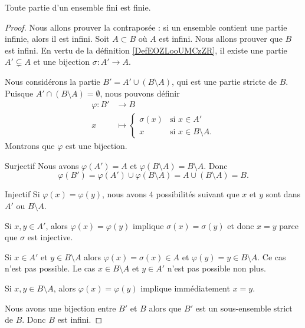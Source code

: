 \begin{lemma}       \label{LEMooTUIRooEXjfDY}
    Toute partie d'un ensemble fini est finie.
\end{lemma}

\begin{proof}
    Nous allons prouver la contraposée : si un ensemble contient une partie infinie, alors il est infini. Soit \( A\subset B\) où \( A\) est infini. Nous allons prouver que \( B\) est infini. En vertu de la définition \ref{DefEOZLooUMCzZR}, il existe une partie \( A'\subsetneq A\) et une bijection \( \sigma\colon A'\to A\).

    Nous considérons la partie \( B'=A'\cup(B\setminus A)\), qui est une partie stricte de \( B\). Puisque \( A'\cap (B\setminus A)=\emptyset\), nous pouvons définir
    \begin{equation}
        \begin{aligned}
            \varphi\colon B'&\to B \\
            x&\mapsto \begin{cases}
                \sigma(x)    &   \text{si } x\in A'\\
                x    &    \text{si } x\in B\setminus A.
            \end{cases}
        \end{aligned}
    \end{equation}
    Montrons que \( \varphi\) est une bijection.
    \begin{subproof}
    \item[Surjectif]
        Nous avons \( \varphi(A')=A\) et \( \varphi(B\setminus A)=B\setminus A\). Donc
        \begin{equation}
            \varphi(B')=\varphi(A')\cup\varphi(B\setminus A)=A\cup (B\setminus A)=B.
        \end{equation}
    \item[Injectif]
        Si \( \varphi(x)=\varphi(y)\), nous avons \( 4\) possibilités suivant que \( x\) et \( y\) sont dans \( A'\) ou \( B\setminus A\).

        Si \( x,y\in A'\), alors \( \varphi(x)=\varphi(y)\) implique \( \sigma(x)=\sigma(y)\) et donc \( x=y\) parce que \( \sigma\) est injective.

        Si \( x\in A'\) et \( y\in B\setminus A\) alors \( \varphi(x)=\sigma(x)\in A\) et \( \varphi(y)=y\in B\setminus A\). Ce cas n'est pas possible. Le cas \( x\in B\setminus A\) et \( y\in A'\) n'est pas possible non plus.

        Si \( x,y\in B\setminus A\), alors \( \varphi(x)=\varphi(y)\) implique immédiatement \( x=y\).
    \end{subproof}
    Nous avons une bijection entre \( B'\) et \( B\) alors que \( B'\) est un sous-ensemble strict de \( B\). Donc \( B\) est infini.
\end{proof}

